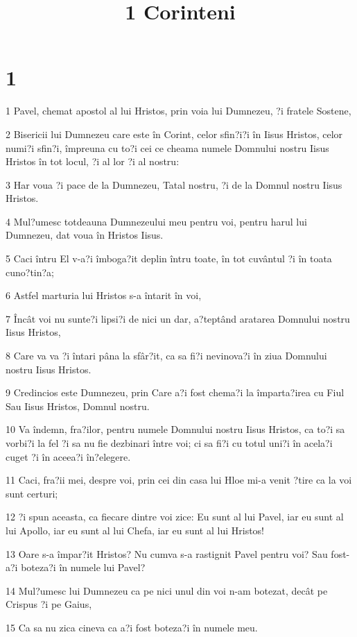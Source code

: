 

\title{1 Corinteni}


\chapter{1}

\par 1 Pavel, chemat apostol al lui Hristos, prin voia lui Dumnezeu, ?i fratele Sostene,
\par 2 Bisericii lui Dumnezeu care este în Corint, celor sfin?i?i în Iisus Hristos, celor numi?i sfin?i, împreuna cu to?i cei ce cheama numele Domnului nostru Iisus Hristos în tot locul, ?i al lor ?i al nostru:
\par 3 Har voua ?i pace de la Dumnezeu, Tatal nostru, ?i de la Domnul nostru Iisus Hristos.
\par 4 Mul?umesc totdeauna Dumnezeului meu pentru voi, pentru harul lui Dumnezeu, dat voua în Hristos Iisus.
\par 5 Caci întru El v-a?i îmboga?it deplin întru toate, în tot cuvântul ?i în toata cuno?tin?a;
\par 6 Astfel marturia lui Hristos s-a întarit în voi,
\par 7 Încât voi nu sunte?i lipsi?i de nici un dar, a?teptând aratarea Domnului nostru Iisus Hristos,
\par 8 Care va va ?i întari pâna la sfâr?it, ca sa fi?i nevinova?i în ziua Domnului nostru Iisus Hristos.
\par 9 Credincios este Dumnezeu, prin Care a?i fost chema?i la împarta?irea cu Fiul Sau Iisus Hristos, Domnul nostru.
\par 10 Va îndemn, fra?ilor, pentru numele Domnului nostru Iisus Hristos, ca to?i sa vorbi?i la fel ?i sa nu fie dezbinari între voi; ci sa fi?i cu totul uni?i în acela?i cuget ?i în aceea?i în?elegere.
\par 11 Caci, fra?ii mei, despre voi, prin cei din casa lui Hloe mi-a venit ?tire ca la voi sunt certuri;
\par 12 ?i spun aceasta, ca fiecare dintre voi zice: Eu sunt al lui Pavel, iar eu sunt al lui Apollo, iar eu sunt al lui Chefa, iar eu sunt al lui Hristos!
\par 13 Oare s-a împar?it Hristos? Nu cumva s-a rastignit Pavel pentru voi? Sau fost-a?i boteza?i în numele lui Pavel?
\par 14 Mul?umesc lui Dumnezeu ca pe nici unul din voi n-am botezat, decât pe Crispus ?i pe Gaius,
\par 15 Ca sa nu zica cineva ca a?i fost boteza?i în numele meu.
